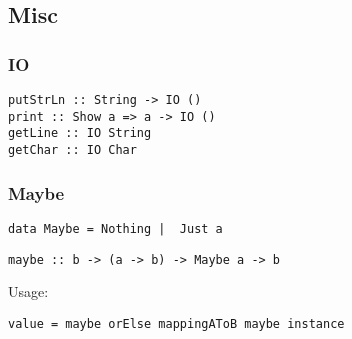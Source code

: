 \subsection{Misc}
\subsubsection{IO}
\begin{verbatim}
putStrLn :: String -> IO ()
print :: Show a => a -> IO ()
getLine :: IO String
getChar :: IO Char
\end{verbatim}
\subsubsection{Maybe}
\begin{verbatim}
data Maybe = Nothing |  Just a
\end{verbatim}
\begin{verbatim}
maybe :: b -> (a -> b) -> Maybe a -> b
\end{verbatim}
Usage:
\begin{verbatim}
value = maybe orElse mappingAToB maybe instance
\end{verbatim}
